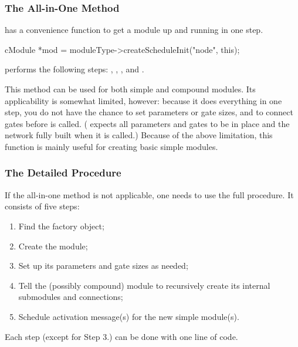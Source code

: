 \subsubsection{The All-in-One Method}

 has a  convenience function to get a module up
and running in one step.

\begin{cpp}
cModule *mod = moduleType->createScheduleInit("node", this);
\end{cpp}

 performs the following steps: ,
, ,
 and .

This method can be used for both simple and compound modules. Its
applicability is somewhat limited, however: because it does everything in
one step, you do not have the chance to set parameters or gate sizes, and
to connect gates before  is called.
( expects all parameters and gates to be in place and
the network fully built when it is called.) Because of the above
limitation, this function is mainly useful for creating basic simple
modules.


\subsubsection{The Detailed Procedure}

If the  all-in-one method is not applicable,
one needs to use the full procedure. It consists of five steps:

\begin{enumerate}
  \item Find the factory object;
  \item Create the module;
  \item Set up its parameters and gate sizes as needed;
  \item Tell the (possibly compound) module to recursively create
        its internal submodules and connections;
  \item Schedule activation message(s) for the new simple module(s).
\end{enumerate}

Each step (except for Step 3.) can be done with one line of code.

